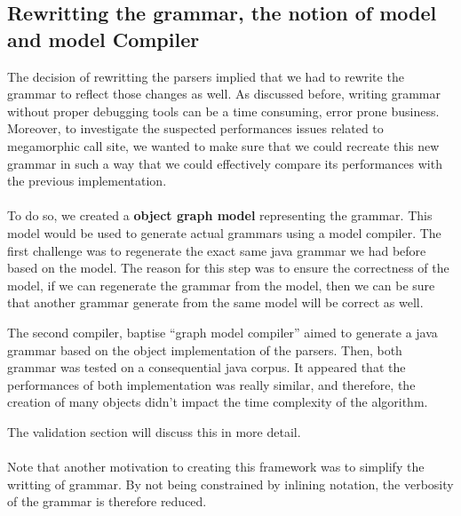 	\subsection{Rewritting the grammar, the notion of model and model Compiler}
%

	The decision of rewritting the parsers implied that we had to rewrite the grammar to reflect those changes as well. As discussed before, writing grammar without proper debugging tools can be a time consuming, error prone business. Moreover, to investigate the suspected performances issues related to megamorphic call site, we wanted to make sure that we could recreate this new grammar in such a way that we could effectively compare its performances with the previous implementation.

	\paragraph{}

	To do so, we created a \textbf{object graph model} representing the grammar. This model would be used to generate actual grammars using a model compiler. The first challenge was to regenerate the exact same java grammar we had before based on the model. The reason for this step was to ensure the correctness of the model, if we can regenerate the grammar from the model, then we can be sure that another grammar generate from the same model will be correct as well.

	The second compiler, baptise ``graph model compiler'' aimed to generate a java grammar based on the object implementation of the parsers. Then, both grammar was tested on a consequential java corpus. It appeared that the performances of both implementation was really similar, and therefore, the creation of many objects didn't impact the time complexity of the algorithm.

	The validation section will discuss this in more detail.

	\paragraph{}

	Note that another motivation to creating this framework was to simplify the writting of grammar. By not being constrained by inlining notation, the verbosity of the grammar is therefore reduced.

